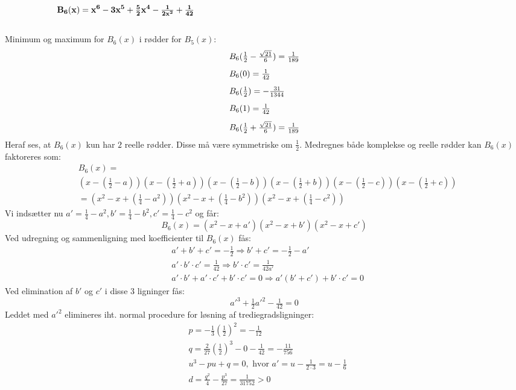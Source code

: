 \[\mathbf{B_{6}(x)=x^{6}-3x^{5}+\tfrac{5}{2}x^{4}-\tfrac{1}{2x^{2}}+\tfrac{1}{42}} \MinLinie\]\\
Minimum og maximum for \(B_{6}(x)\) i rødder for \(B_{5}(x)\):
\begin{equation*}
\begin{array}{l}
B_{6}(\tfrac{1}{2}-\tfrac{\sqrt{21}}{6})=\tfrac{1}{189} \nylinie
B_{6}(0)=\tfrac{1}{42}\nylinie
B_{6}(\tfrac{1}{2})=-\tfrac{31}{1344}\nylinie
B_{6}(1)=\tfrac{1}{42}\nylinie
B_{6}(\tfrac{1}{2}+\tfrac{\sqrt{21}}{6})=\tfrac{1}{189}
\end{array}
\end{equation*}
Heraf ses, at \(B_{6}(x)\) kun har \(2\) reelle rødder. Disse må være symmetriske om \(\tfrac{1}{2}\). Medregnes både komplekse og reelle rødder kan \(B_{6}(x)\) faktoreres som:
\begin{align*}
&B_{6}(x)=\\
&\left(x-(\tfrac{1}{2}-a)\right)\left(x-(\tfrac{1}{2}+a)\right)\left(x-(\tfrac{1}{2}-b)\right)\left(x-(\tfrac{1}{2}+b)\right)\left(x-(\tfrac{1}{2}-c)\right)\left(x-(\tfrac{1}{2}+c)\right)\\
&=\left(x^{2}-x+(\tfrac{1}{4}-a^{2})\right)\left(x^{2}-x+(\tfrac{1}{4}-b^{2})\right)\left(x^{2}-x+(\tfrac{1}{4}-c^{2})\right)
\end{align*}
Vi indsætter nu \(a'=\tfrac{1}{4}-a^{2},b'=\tfrac{1}{4}-b^{2},c'=\tfrac{1}{4}-c^{2}\) og får:
\[B_{6}(x)=(x^{2}-x+a')(x^{2}-x+b')(x^{2}-x+c')\]
Ved udregning og sammenligning med koefficienter til \(B_{6}(x)\) fås:
\begin{align*}
&a'+b'+c'=-\tfrac{1}{2} \Rightarrow b'+c'=-\tfrac{1}{2}-a'\\
&a' \cdot b' \cdot c'=\tfrac{1}{42} \Rightarrow b' \cdot c' =\tfrac{1}{42a'}\\
&a' \cdot b' + a' \cdot c' + b' \cdot c'=0 \Rightarrow a'(b'+c')+b' \cdot c'=0
\end{align*}
Ved elimination af \(b'\) og \(c'\) i disse \(3\) ligninger fås:
\[a'^{3}+\tfrac{1}{2}a'^{2}-\tfrac{1}{42}=0\] 
Leddet med \(a'^{2}\) elimineres iht. normal procedure for løsning af trediegradsligninger:
\begin{align*}
&p=-\tfrac{1}{3}(\tfrac{1}{2})^{2}=-\tfrac{1}{12}\\
&q=\tfrac{2}{27}(\tfrac{1}{2})^{3}-0-\tfrac{1}{42}=-\tfrac{11}{756}\\
&u^{3}-pu+q=0, \text{ hvor } a'=u-\tfrac{1}{2 \cdot 3}=u-\tfrac{1}{6}\\
&d=\tfrac{q^{2}}{4}-\tfrac{p^{3}}{27}=\tfrac{1}{31752}>0 
\end{align*}
